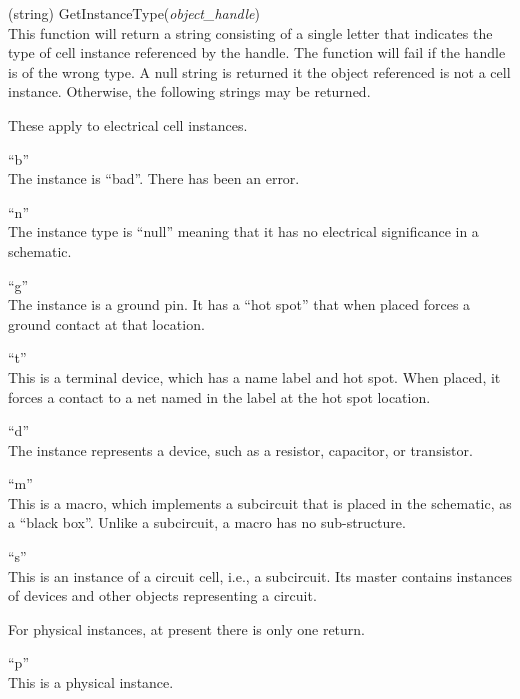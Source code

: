 \begin{description}
\item{(string) \vt GetInstanceType({\it object\_handle\/})}\\
This function will return a string consisting of a single letter that
indicates the type of cell instance referenced by the handle.  The
function will fail if the handle is of the wrong type.  A null string
is returned it the object referenced is not a cell instance. 
Otherwise, the following strings may be returned.

These apply to electrical cell instances.
\begin{description}
\item{``b''}\\
The instance is ``bad''.  There has been an error.

\item{``n''}\\
The instance type is ``null'' meaning that it has no electrical
significance in a schematic.
  
\item{``g''}\\
The instance is a ground pin.  It has a ``hot spot'' that when placed
forces a ground contact at that location.

\item{``t''}\\
This is a terminal device, which has a name label and hot spot.  When
placed, it forces a contact to a net named in the label at the hot
spot location.

\item{``d''}\\
The instance represents a device, such as a resistor, capacitor, or
transistor.

\item{``m''}\\
This is a macro, which implements a subcircuit that is placed in the
schematic, as a ``black box''.  Unlike a subcircuit, a macro has no
sub-structure.

\item{``s''}\\
This is an instance of a circuit cell, i.e., a subcircuit.  Its master
contains instances of devices and other objects representing a
circuit.
\end{description}

For physical instances, at present there is only one return.
\begin{description}
\item{``p''}\\
   This is a physical instance.
\end{description}


\end{description}
